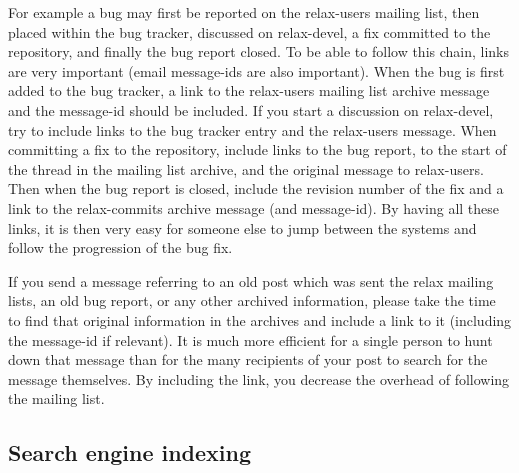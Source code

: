 For example a bug may first be reported on the relax-users mailing list, then placed within the bug tracker, discussed on relax-devel, a fix committed to the repository, and finally the bug report closed.
To be able to follow this chain, links are very important (email message-ids are also important).
When the bug is first added to the bug tracker, a link to the relax-users mailing list archive message and the message-id should be included.
If you start a discussion on relax-devel, try to include links to the bug tracker entry and the relax-users message.
When committing a fix to the repository, include links to the bug report, to the start of the thread in the mailing list archive, and the original message to relax-users.
Then when the bug report is closed, include the revision number of the fix and a link to the relax-commits archive message (and message-id).
By having all these links, it is then very easy for someone else to jump between the systems and follow the progression of the bug fix.

If you send a message referring to an old post which was sent the relax mailing lists, an old bug report, or any other archived information, please take the time to find that original information in the archives and include a link to it (including the message-id if relevant).
It is much more efficient for a single person to hunt down that message than for the many recipients of your post to search for the message themselves.
By including the link, you decrease the overhead of following the mailing list.



\subsection{Search engine indexing}

